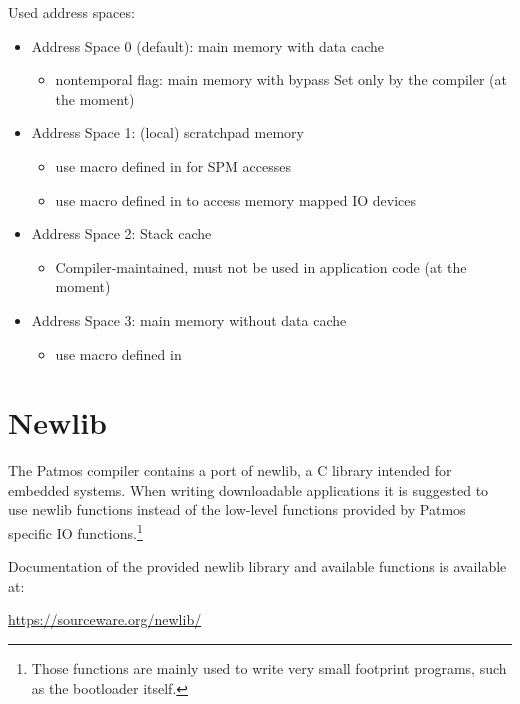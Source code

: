 Used address spaces:
\begin{itemize}
\item Address Space 0 (default): main memory with data cache
  \begin{itemize}
  \item nontemporal flag: main memory with bypass
      Set only by the compiler (at the moment)
  \end{itemize}
\item Address Space 1: (local) scratchpad memory
  \begin{itemize}
  \item use macro  defined in  for SPM accesses
  \item use macro  defined in  to access memory mapped IO devices
  \end{itemize}
\item Address Space 2: Stack cache
  \begin{itemize}
  \item Compiler-maintained, must not be used in application code (at the moment)
  \end{itemize}
\item Address Space 3: main memory without data cache
  \begin{itemize}
  \item use macro  defined in 
  \end{itemize}
\end{itemize}

\section{Newlib}

The Patmos compiler contains a port of newlib, a C library intended for embedded systems. When  writing
downloadable applications it is suggested to use newlib functions instead of the low-level functions provided
by Patmos specific IO functions.\footnote{Those functions are mainly used to write very small footprint programs,
such as the bootloader itself.}

Documentation of the provided newlib library and available functions is available at:

\url{https://sourceware.org/newlib/}

